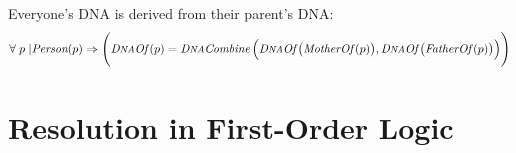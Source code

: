 \begin{enumerate}
Everyone's DNA is derived from their parent's DNA:
\begin{displaymath}
\forall \; p \; | \textit{Person}(p) \Rightarrow \Bigg(\textit{D{\footnotesize NA}Of\thinspace}(p) = \textit{D{\footnotesize NA}Combine\thinspace}\Big(\textit{D{\footnotesize NA}Of\thinspace}\big(\textit{MotherOf\thinspace}(p)\big), \textit{D{\footnotesize NA}Of\thinspace}\big(\textit{FatherOf\thinspace}(p)\big)\Big)\Bigg)
\end{displaymath}

\end{enumerate}

\section{Resolution in First-Order Logic}

